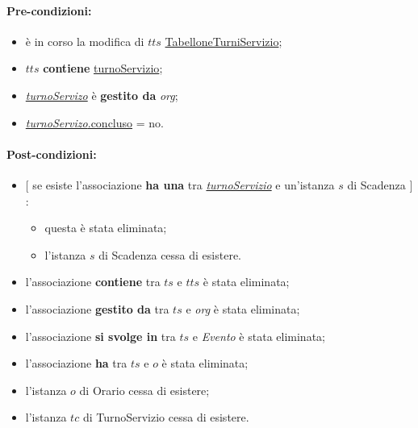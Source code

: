 \paragraph{Pre-condizioni:}
\begin{itemize}
 \item è in corso la modifica di $tts$ \underline{TabelloneTurniServizio};
 \item $tts$ \textbf{contiene} \underline{turnoServizio};
   \item \underline{\textit{turnoServizo}} è \textbf{gestito da} {\textit{org}};
   \item \underline{\textit{turnoServizo}.concluso} = no.
\end{itemize}

\paragraph{Post-condizioni:} 
\begin{itemize}
    \item $[$ se esiste l'associazione \textbf{ha una} tra \underline{\textit{turnoServizio}} e un'istanza $s$ di Scadenza $]$:
    \begin{itemize}
    \item questa è stata eliminata;
    \item l'istanza $s$ di Scadenza cessa di esistere.
    \end{itemize}
  \item l'associazione \textbf{contiene} tra $ts$ e $tts$ è stata eliminata;
 \item l'associazione \textbf{gestito da} tra $ts$ e \textit{org} è stata eliminata;
\item l'associazione \textbf{si svolge in} tra $ts$ e \textit{Evento} è stata eliminata;
 \item l'associazione \textbf{ha} tra $ts$ e $o$ è stata eliminata;
    \item l'istanza $o$ di Orario cessa di esistere;
    \item l'istanza $tc$ di TurnoServizio cessa di esistere.

 
\end{itemize}
